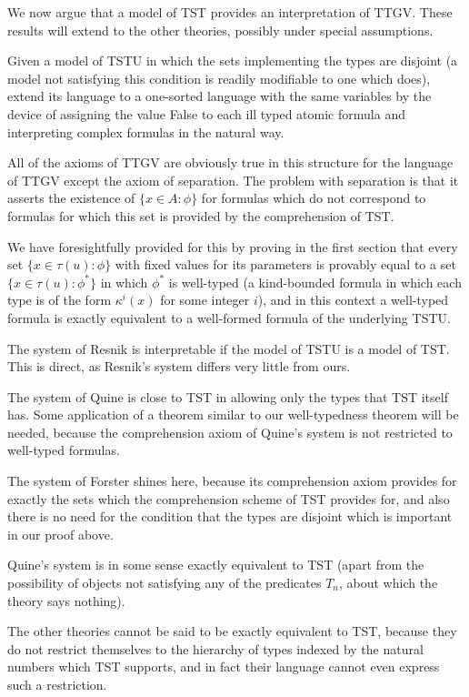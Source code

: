 \documentclass[12pt]{article}
\begin{document}
We now argue that a model of TST provides an interpretation of TTGV.  These results will extend
to the other theories, possibly under special assumptions.

Given a model of TSTU in which the sets implementing the types are disjoint (a model not satisfying this condition is readily modifiable to one which does), extend its language to a one-sorted language with the same variables
by the device of assigning the value False to each ill typed atomic formula and interpreting complex formulas in the natural way.

All of the axioms of TTGV are obviously true in this structure for the language of TTGV except the axiom of separation.  The problem with separation is that it asserts the existence of $\{x \in A:\phi\}$ for formulas
which do not correspond to formulas for which this set is provided by the comprehension of TST.

We have foresightfully provided for this by proving in the first section that every set $\{x \in \tau(u):\phi\}$ with fixed values for its parameters is provably equal to a set $\{x \in \tau(u):\phi^*\}$ in which $\phi^*$ is well-typed (a kind-bounded formula in which each type is of the form $\kappa^i(x)$ for some integer $i$), and in this context a well-typed formula is exactly equivalent to a well-formed formula of the underlying TSTU.

The system of Resnik is interpretable if the model of TSTU is a model of TST.  This is direct, as Resnik's system differs very little from ours.

The system of Quine is close to TST in allowing only the types that TST itself has.  Some application of a theorem similar to our well-typedness theorem will be needed, because the comprehension axiom of Quine's system is not restricted to well-typed formulas.

The system of Forster shines here, because its comprehension axiom provides for exactly the sets which the comprehension scheme of TST provides for, and also there is no need for the condition that the types are disjoint which is important in our proof above.

Quine's system is in some sense exactly equivalent to TST (apart from the possibility of objects not satisfying any of the predicates $T_n$, about which the theory says nothing).

The other theories cannot be said to be exactly equivalent to TST, because they do not restrict themselves to the hierarchy of types indexed by the natural numbers which TST supports, and in fact their language cannot even express such a restriction.
\end{document}
